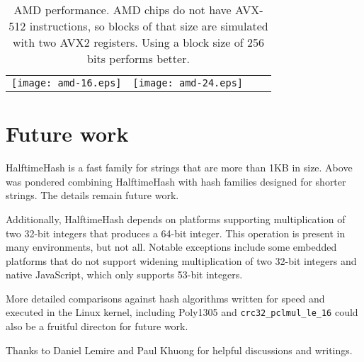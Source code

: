\documentclass[sigconf, nonacm]{acmart}
\begin{document}
\begin{table*}
\begin{tabular}{cccc}
\texttt{[image: amd-16.eps]}
&
\texttt{[image: amd-24.eps]}
\end{tabular}
\caption{
  \label{block-size}
  AMD performance.
  AMD chips do not have AVX-512 instructions, so blocks of that size are simulated with two AVX2 registers.
  Using a block size of 256 bits performs better.}
\end{table*}





\section{Future work}

HalftimeHash is a fast family for strings that are more than 1KB in size.
Above was pondered combining HalftimeHash with hash families designed for shorter strings.
The details remain future work.

Additionally, HalftimeHash depends on platforms supporting multiplication of two 32-bit integers that produces a 64-bit integer.
This operation is present in many environments, but not all.
Notable exceptions include some embedded platforms that do not support widening multiplication of two 32-bit integers and native JavaScript, which only supports 53-bit integers.

More detailed comparisons against hash algorithms written for speed and executed in the Linux kernel, including Poly1305 and \texttt{crc32\_pclmul\_le\_16} could also be a fruitful directon for future work.



\begin{acks}
Thanks to Daniel Lemire and Paul Khuong for helpful discussions and writings.
\end{acks}
\end{document}
